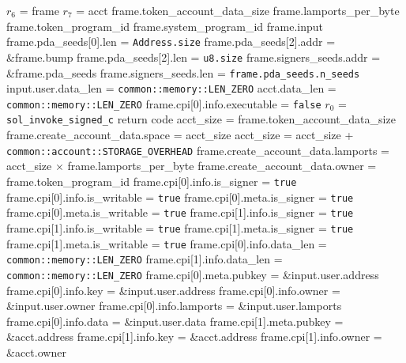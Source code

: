 \begin{algorithm}
\caption{CREATE-VAULT-ACCOUNT}
\begin{algorithmic}
  \INPUT $r_6$ = frame
  \INPUT $r_7$ = acct
  \REQUIRE frame.token\_account\_data\_size
  \REQUIRE frame.lamports\_per\_byte
  \REQUIRE frame.token\_program\_id
  \REQUIRE frame.system\_program\_id
  \REQUIRE frame.input
  \REQUIRE frame.pda\_seeds[0].len = \texttt{Address.size}
  \REQUIRE frame.pda\_seeds[2].addr = \&frame.bump
  \REQUIRE frame.pda\_seeds[2].len = \texttt{u8.size}
  \REQUIRE frame.signers\_seeds.addr = \&frame.pda\_seeds
  \REQUIRE frame.signers\_seeds.len = \texttt{frame.pda\_seeds.n\_seeds}
  \REQUIRE input.user.data\_len = \texttt{common::memory::LEN\_ZERO}
  \REQUIRE acct.data\_len = \texttt{common::memory::LEN\_ZERO}
  \REQUIRE frame.cpi[0].info.executable = \texttt{false}
  \ENSURE $r_0$ = \texttt{sol\_invoke\_signed\_c} return code
  \STATE acct\_size = frame.token\_account\_data\_size
  \STATE frame.create\_account\_data.space = acct\_size
  \STATE acct\_size = acct\_size + \texttt{common::account::STORAGE\_OVERHEAD}
  \STATE frame.create\_account\_data.lamports =
    acct\_size $\times$ frame.lamports\_per\_byte
  \STATE frame.create\_account\_data.owner = frame.token\_program\_id
  \STATE frame.cpi[0].info.is\_signer = \texttt{true}
  \STATE frame.cpi[0].info.is\_writable = \texttt{true}
  \STATE frame.cpi[0].meta.is\_signer = \texttt{true}
  \STATE frame.cpi[0].meta.is\_writable = \texttt{true}
  \STATE frame.cpi[1].info.is\_signer = \texttt{true}
  \STATE frame.cpi[1].info.is\_writable = \texttt{true}
  \STATE frame.cpi[1].meta.is\_signer = \texttt{true}
  \STATE frame.cpi[1].meta.is\_writable = \texttt{true}
  \STATE frame.cpi[0].info.data\_len = \texttt{common::memory::LEN\_ZERO}
  \STATE frame.cpi[1].info.data\_len = \texttt{common::memory::LEN\_ZERO}
  \STATE frame.cpi[0].meta.pubkey = \&input.user.address
  \STATE frame.cpi[0].info.key = \&input.user.address
  \STATE frame.cpi[0].info.owner = \&input.user.owner
  \STATE frame.cpi[0].info.lamports = \&input.user.lamports
  \STATE frame.cpi[0].info.data = \&input.user.data
  \STATE frame.cpi[1].meta.pubkey = \&acct.address
  \STATE frame.cpi[1].info.key = \&acct.address
  \STATE frame.cpi[1].info.owner = \&acct.owner

\end{algorithmic}
\end{algorithm}
